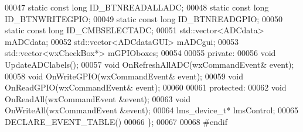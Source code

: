 \begin{DoxyCode}
00047     \textcolor{keyword}{static} \textcolor{keyword}{const} \textcolor{keywordtype}{long} ID_BTNREADALLADC;
00048     \textcolor{keyword}{static} \textcolor{keyword}{const} \textcolor{keywordtype}{long} ID_BTNWRITEGPIO;
00049     \textcolor{keyword}{static} \textcolor{keyword}{const} \textcolor{keywordtype}{long} ID_BTNREADGPIO;
00050     \textcolor{keyword}{static} \textcolor{keyword}{const} \textcolor{keywordtype}{long} ID_CMBSELECTADC;
00051     std::vector<ADCdata> mADCdata;
00052     std::vector<ADCdataGUI> mADCgui;
00053     std::vector<wxCheckBox*> mGPIOboxes;
00054 
00055 \textcolor{keyword}{private}:
00056     \textcolor{keywordtype}{void} UpdateADClabels();
00057     \textcolor{keywordtype}{void} OnRefreshAllADC(wxCommandEvent& event);
00058     \textcolor{keywordtype}{void} OnWriteGPIO(wxCommandEvent& event);
00059     \textcolor{keywordtype}{void} OnReadGPIO(wxCommandEvent& event);
00060 
00061 \textcolor{keyword}{protected}:
00062     \textcolor{keywordtype}{void} OnReadAll(wxCommandEvent &event);
00063     \textcolor{keywordtype}{void} OnWriteAll(wxCommandEvent &event);
00064     lms_device_t* lmsControl;
00065     DECLARE\_EVENT\_TABLE()
00066 \};
00067 
00068 \textcolor{preprocessor}{#endif}
\end{DoxyCode}
